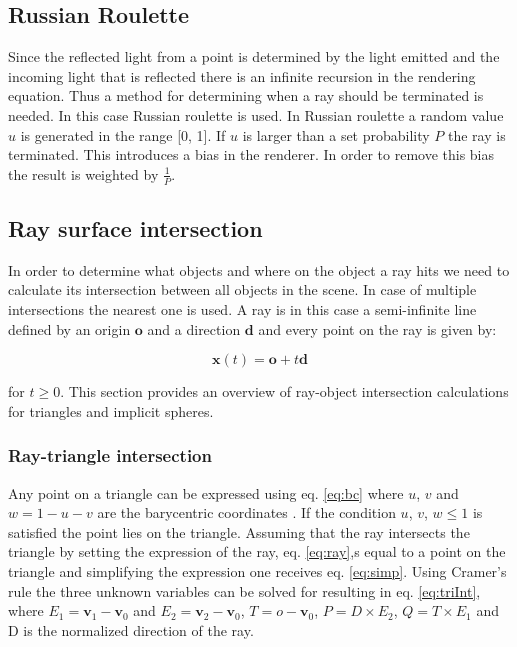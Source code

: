 \documentclass[twocolumn]{article}
\begin{document}
\subsection{Russian Roulette}
Since the reflected light from a point is determined by the light emitted and the incoming light that is reflected there is an infinite recursion in the rendering equation. Thus a method for determining when a ray should be terminated is needed. In this case Russian roulette is used. In Russian roulette a random value $u$ is generated in the range [0, 1]. If $u$ is larger than a set probability $P$ the ray is terminated. This introduces a bias in the renderer. In order to remove this bias the result is weighted by $\frac{1}{P}$.

\subsection{Ray surface intersection}
In order to determine what objects and where on the object a ray hits we need to calculate its intersection between all objects in the scene. In case of multiple intersections the nearest one is used. A ray is in this case a semi-infinite line defined by an origin $\mathbf{o}$ and a direction $\mathbf{d}$ and every point on the ray is given by:

\begin{equation}
	\label{eq:ray}
	\mathbf{x}(t) = \mathbf{o} + t\mathbf{d}
\end{equation}

for $t \geq 0$. This section provides an overview of ray-object intersection calculations for triangles and implicit spheres. 

\subsubsection{Ray-triangle intersection}
Any point on a triangle can be expressed using eq. \ref{eq:bc} where $u$, $v$ and $ w = 1 - u - v$ are the barycentric coordinates \cite{hq}. If the condition $u$, $v$, $w \leq 1$ is satisfied the point lies on the triangle. Assuming that the ray intersects the triangle by setting the expression of the ray, eq. \ref{eq:ray},s equal to a point on the triangle and simplifying the expression one receives eq. \ref{eq:simp}. Using Cramer's rule the three unknown variables can be solved for resulting in eq. \ref{eq:triInt}, where $E_1 = \mathbf{v}_1 - \mathbf{v}_0$ and $E_2 = \mathbf{v}_2 - \mathbf{v}_0$, $T = o - \mathbf{v}_0$, $P = D \times E_2$, $Q = T \times E_1$ and D is the normalized direction of the ray.
\end{document}
